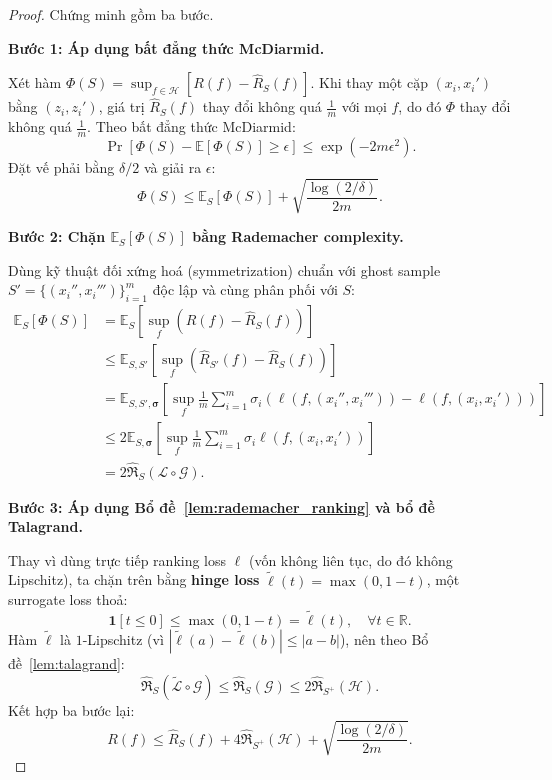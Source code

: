 \begin{proof}
Chứng minh gồm ba bước.

\textbf{Bước 1: Áp dụng bất đẳng thức McDiarmid.}

Xét hàm $\Phi(S) = \sup_{f \in \mathcal{H}} [R(f) - \hat{R}_S(f)]$. 
Khi thay một cặp $(x_i, x_i')$ bằng $(z_i, z_i')$, giá trị 
$\hat{R}_S(f)$ thay đổi không quá $\frac{1}{m}$ với mọi $f$, 
do đó $\Phi$ thay đổi không quá $\frac{1}{m}$. Theo bất đẳng thức 
McDiarmid:
\[
  \Pr\left[\Phi(S) - \mathbb{E}[\Phi(S)] \geq \epsilon\right] 
  \leq \exp\left(-2m\epsilon^2\right).
\]
Đặt vế phải bằng $\delta/2$ và giải ra $\epsilon$:
\[
  \Phi(S) \leq \mathbb{E}_S[\Phi(S)] + \sqrt{\frac{\log(2/\delta)}{2m}}.
\]

\textbf{Bước 2: Chặn $\mathbb{E}_S[\Phi(S)]$ bằng Rademacher complexity.}

Dùng kỹ thuật đối xứng hoá (symmetrization) chuẩn với ghost sample 
$S' = \{(x_i'', x_i''')\}_{i=1}^m$ độc lập và cùng phân phối với $S$:
\begin{align*}
  \mathbb{E}_S[\Phi(S)] 
  &= \mathbb{E}_S\left[\sup_{f} (R(f) - \hat{R}_S(f))\right] \\
  &\leq \mathbb{E}_{S,S'}\left[\sup_{f} 
      (\hat{R}_{S'}(f) - \hat{R}_S(f))\right] \\
  &= \mathbb{E}_{S,S',\boldsymbol{\sigma}}\left[\sup_{f} 
      \frac{1}{m}\sum_{i=1}^m \sigma_i 
      (\ell(f,(x_i'',x_i''')) - \ell(f,(x_i,x_i')))\right] \\
  &\leq 2\mathbb{E}_{S,\boldsymbol{\sigma}}\left[\sup_{f} 
      \frac{1}{m}\sum_{i=1}^m \sigma_i \ell(f,(x_i,x_i'))\right] \\
  &= 2\hat{\mathfrak{R}}_S(\mathcal{L} \circ \mathcal{G}).
\end{align*}

\textbf{Bước 3: Áp dụng Bổ đề~\ref{lem:rademacher_ranking} và 
bổ đề Talagrand.}

Thay vì dùng trực tiếp ranking loss $\ell$ (vốn không liên tục, 
do đó không Lipschitz), ta chặn trên bằng \textbf{hinge loss} 
$\tilde{\ell}(t) = \max(0, 1 - t)$, một surrogate loss thoả:
\[
  \mathbf{1}[t \leq 0] \leq \max(0, 1-t) = \tilde{\ell}(t), 
  \quad \forall t \in \mathbb{R}.
\]
Hàm $\tilde{\ell}$ là $1$-Lipschitz (vì 
$|\tilde{\ell}(a) - \tilde{\ell}(b)| \leq |a - b|$), 
nên theo Bổ đề~\ref{lem:talagrand}:
\[
  \hat{\mathfrak{R}}_S(\tilde{\mathcal{L}} \circ \mathcal{G}) 
  \leq \hat{\mathfrak{R}}_S(\mathcal{G}) 
  \leq 2\hat{\mathfrak{R}}_{S^+}(\mathcal{H}).
\]
Kết hợp ba bước lại:
\[
  R(f) \leq \hat{R}_S(f) + 4\hat{\mathfrak{R}}_{S^+}(\mathcal{H}) 
  + \sqrt{\frac{\log(2/\delta)}{2m}}.
\]
\end{proof}


